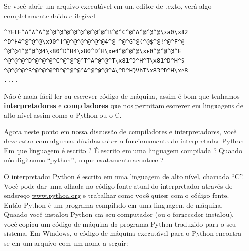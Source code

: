 Se você abrir um arquivo executável em um editor de texto, verá algo completamente
doido e ilegível.
%

\beforeverb
\begin{verbatim}
^?ELF^A^A^A^@^@^@^@^@^@^@^@^@^B^@^C^@^A^@^@^@\xa0\x82
^D^H4^@^@^@\x90^]^@^@^@^@^@^@4^@ ^@^G^@(^@$^@!^@^F^@
^@^@4^@^@^@4\x80^D^H4\x80^D^H\xe0^@^@^@\xe0^@^@^@^E
^@^@^@^D^@^@^@^C^@^@^@^T^A^@^@^T\x81^D^H^T\x81^D^H^S
^@^@^@^S^@^@^@^D^@^@^@^A^@^@^@^A\^D^HQVhT\x83^D^H\xe8
....
\end{verbatim}
\afterverb

Não é nada fácil ler ou escrever código de máquina, assim é bom que tenhamos
{\bf interpretadores} e {\bf compiladores} que nos permitam escrever em linguagens
de alto nível assim como o Python ou o C.
%

Agora neste ponto em nossa discussão de compiladores e interpretadores, você deve
estar com algumas dúvidas sobre o funcionamento do interpretador Python. Em que 
linguagem é escrito ? É escrito em uma linguagem compilada ? Quando nós
digitamos ``python'', o que exatamente acontece ?
%

O interpretador Python é escrito em uma linguagem de alto nível, chamada ``C''.
Você pode dar uma olhada no código fonte atual do interpretador através
do endereço \url{www.python.org} e trabalhar como você quiser com o código fonte.
Então Python é um programa compilado em uma linguagem de máquina.
Quando você instalou Python em seu computador (ou o fornecedor instalou),
você copiou um código de máquina do programa Python traduzido para o seu sistema.
Em Windows, o código de máquina executável para o Python encontra-se em um
arquivo com um nome a seguir: 
%

